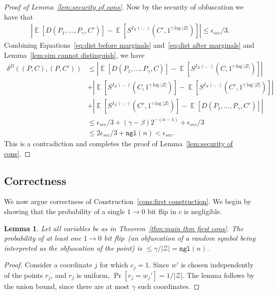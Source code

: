 \documentclass[11pt]{article}
\newtheorem{lemma}[theorem]{Lemma}
\newcommand{\thref}[1]{\mbox{Theorem~\ref{#1}}}
\newcommand{\lemref}[1]{\mbox{Lemma~\ref{#1}}}
\newcommand{\consref}[1]{\mbox{Construction~\ref{#1}}}
\DeclareMathOperator*{\expe}{\mathbb{E}}
\newcommand{\dis}{\ensuremath{\mathsf{dis}}}
\newcommand{\ngl}{\ensuremath{\mathtt{ngl}}\xspace}
\begin{document}
\begin{proof}[Proof of \lemref{lem:security of cons}]
\noindent Now by the security of obfuscation we have that
\begin{align}
\label{eq:dist after marginals}
|\expe [D(P_1,..., P_\gamma, C') ]- \expe [S^{I_X(\cdot, \cdot)}(C', 1^{\gamma \log |Z|})] |\leq \epsilon_{sec}/3.
\end{align}
Combining Equations~\ref{eq:dist before marginals} and~\ref{eq:dist after marginals} and \lemref{lem:sim cannot distinguish}, we have
\begin{align*}
\delta^{D}(( P, C), (P, C'))&\leq |\expe [D(P_1,..., P_\gamma, C)] - \expe [S^{I_X(\cdot, \cdot)}(C, 1^{\gamma \log |Z|})]| \\
&+|\expe[S^{I_X(\cdot, \cdot)}(C, 1^{\gamma \log |Z|})] - \expe[S^{I_X(\cdot, \cdot)}(C', 1^{\gamma \log |Z|})] |\\
&+|\expe [S^{I_X(\cdot, \cdot)}(C', 1^{\gamma \log |Z|})] - \expe [D(P_1,..., P_\gamma, C') ]|\\
&\leq \epsilon_{sec}/3+ (\gamma-\beta)2^{-(\alpha-1)}+\epsilon_{sec}/3 \\
&\leq 2\epsilon_{sec}/3 + \ngl(n) < \epsilon_{sec}.
\end{align*}
This is a contradiction and completes the proof of \lemref{lem:security of cons}.
\end{proof}

\subsection{Correctness}
We now argue correctness of \consref{cons:first construction}.
We begin by showing that the probability of a single $1\rightarrow 0$ bit flip in $c$ is negligible.
\begin{lemma}
\label{lem:no 1 to 0 flips}
Let all variables be as in \thref{thm:main thm first cons}.
The probability of at least one $1\rightarrow 0$ bit flip~(an obfuscation of a random symbol being interpreted as the obfuscation of the point) is $ \le \gamma/|\mathcal{Z}| = \ngl(n)$.
\end{lemma}
\begin{proof}
Consider a coordinate $j$ for which $c_j=1$. Since $w'$ is chosen independently of the points $r_j$, and $r_j$ is uniform, $\Pr[r_j =w_j']  = 1/|\mathcal{Z}|$. The lemma follows by the union bound, since there are at most $\gamma$ such coordinates.
\end{proof}
\end{document}
